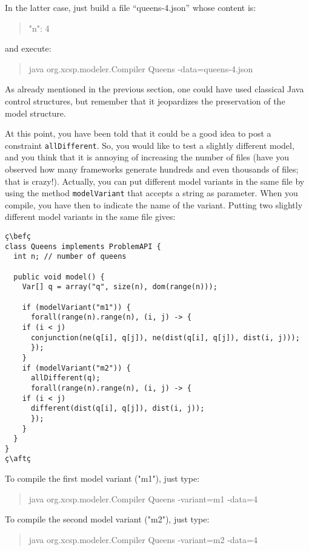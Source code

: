 \documentclass[10pt]{article}
\newcommand{\gb}[1]{{\tt #1}} %
\newcommand{\nn}[1]{{\tt #1}} %
\newenvironment{myvb}{\endgraf\small\verbatim}{\endverbatim}
\def\bef{\rule{10cm}{0.1mm}} %
\def\aft{\rule{10cm}{0.1mm}\medskip}
\begin{document}
In the latter case, just build a file ``queens-4.json'' whose content is:
\begin{quote}
\begin{myvb}
{
  "n": 4
}
\end{myvb}
\end{quote}
and execute:
\begin{quote}
\begin{myvb}
java org.xcsp.modeler.Compiler Queens -data=queens-4.json
\end{myvb}
\end{quote}


As already mentioned in the previous section, one could have used classical Java control structures, but remember that it jeopardizes the preservation of the model structure. 

At this point, you have been told that it could be a good idea to post a constraint \gb{allDifferent}.
So, you would like to test a slightly different model, and you think that it is annoying of increasing the number of files (have you observed how many frameworks generate hundreds and even thousands of files; that is crazy!).
Actually, you can put different model variants in the same file by using the method \nn{modelVariant} that accepts a string as parameter.
When you compile, you have then to indicate the name of the variant.
Putting two slightly different model variants in the same file gives:

\begin{lstlisting}
ç\befç
class Queens implements ProblemAPI {
  int n; // number of queens
  
  public void model() {
    Var[] q = array("q", size(n), dom(range(n)));
    
    if (modelVariant("m1")) {
      forall(range(n).range(n), (i, j) -> {
	if (i < j)
	  conjunction(ne(q[i], q[j]), ne(dist(q[i], q[j]), dist(i, j)));
      });
    }
    if (modelVariant("m2")) {
      allDifferent(q);
      forall(range(n).range(n), (i, j) -> {
	if (i < j)
	  different(dist(q[i], q[j]), dist(i, j));
      });
    }
  }
}
ç\aftç
\end{lstlisting}

To compile the first model variant ("m1"), just type:
\begin{quote}
\begin{myvb}
java org.xcsp.modeler.Compiler Queens -variant=m1 -data=4
\end{myvb}
\end{quote}


To compile the second model variant ("m2"), just type:
\begin{quote}
\begin{myvb}
java org.xcsp.modeler.Compiler Queens -variant=m2 -data=4 
\end{myvb}
\end{quote}
\end{document}
